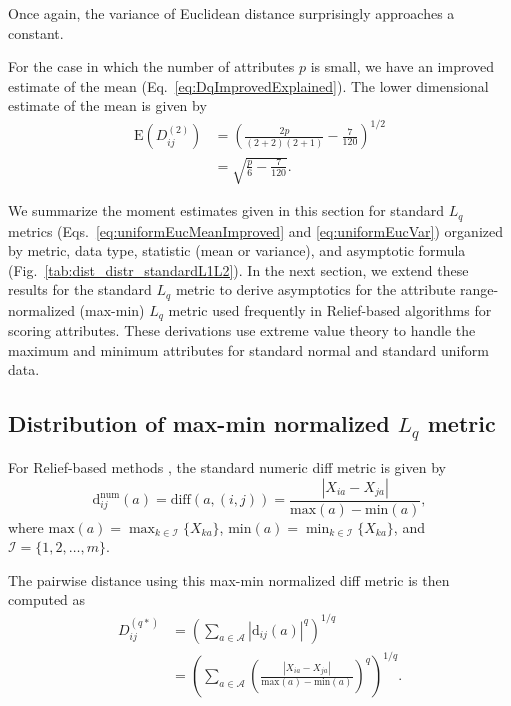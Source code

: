 \documentclass[10pt,letterpaper]{article}
\begin{document}
Once again, the variance of Euclidean distance surprisingly approaches a constant.

For the case in which the number of attributes $p$ is small, we have an improved estimate of the mean (Eq.~\ref{eq:DqImprovedExplained}). The lower dimensional estimate of the mean is given by
%
\begin{equation}\label{eq:uniformEucMeanImproved}
\begin{aligned}
\text{E}\left(D^{(2)}_{ij}\right) &= \left(\frac{2p}{(2+2)(2+1)} - \frac{7}{120}\right)^{1/2} \\
&= \sqrt{\frac{p}{6} - \frac{7}{120}}.
\end{aligned}
\end{equation}

We summarize the moment estimates given in this section for standard $L_q$ metrics (Eqs.~\ref{eq:uniformEucMeanImproved} and \ref{eq:uniformEucVar}) organized by metric, data type, statistic (mean or variance), and asymptotic formula (Fig.~\ref{tab:dist_distr_standardL1L2}). In the next section, we extend these results for the standard $L_q$ metric to derive asymptotics for the attribute range-normalized (max-min) $L_q$ metric used frequently in Relief-based algorithms \cite{urbanowicz17,robnik2003} for scoring attributes. These derivations use extreme value theory to handle the maximum and minimum attributes for standard normal and standard uniform data. 

\subsection{Distribution of max-min normalized \texorpdfstring{$L_q$}{} metric}\label{sec:extremes}

For Relief-based methods \cite{robnik2003,urbanowicz17}, the standard numeric diff metric is given by
%
\begin{equation}\label{eq:normDiff}
\text{d}^{\text{num}}_{ij}(a) = \text{diff}(a,(i,j)) = \frac{|X_{ia} - X_{ja}|}{\text{max}(a) - \text{min}(a)},
\end{equation}
%
where $\text{max}(a) = \displaystyle \max_{k \in \mathcal{I}}\{X_{ka}\}$, $\text{min}(a) = \displaystyle \min_{k \in \mathcal{I}}\{X_{ka}\}$, and $\mathcal{I} = \{1,2,\dots,m\}$. 

The pairwise distance using this max-min normalized diff metric is then computed as
%
\begin{equation}\label{eq:D*}
\begin{aligned}
D^{(q*)}_{ij} &= \left(\sum_{a\in \mathcal{A}}|\text{d}_{ij}(a)|^q\right)^{1/q} \\
&= \left(\sum_{a\in \mathcal{A}}\left(\frac{|X_{ia} - X_{ja}|}{\text{max}(a) - \text{min}(a)}\right)^q\right)^{1/q}.
\end{aligned}
\end{equation}
\end{document}
